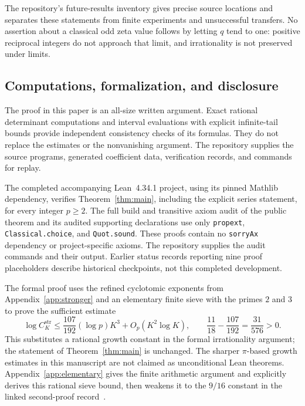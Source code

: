 \documentclass[11pt,letterpaper]{article}
\numberwithin{equation}{section}
\theoremstyle{remark}
\begin{document}
The repository's future-results inventory gives precise source locations and separates these statements from finite experiments and unsuccessful transfers. No assertion about a classical odd zeta value follows by letting $q$ tend to one: positive reciprocal integers do not approach that limit, and irrationality is not preserved under limits.

\subsection{Computations, formalization, and disclosure}

The proof in this paper is an all-size written argument. Exact rational determinant computations and interval evaluations with explicit infinite-tail bounds provide independent consistency checks of its formulas. They do not replace the estimates or the nonvanishing argument. The repository supplies the source programs, generated coefficient data, verification records, and commands for replay.

The completed accompanying Lean~4.34.1 project, using its pinned Mathlib dependency, verifies Theorem~\ref{thm:main}, including the explicit series statement, for every integer $p\ge2$. The full build and transitive axiom audit of the public theorem and its audited supporting declarations use only \texttt{propext}, \texttt{Classical.choice}, and \texttt{Quot.sound}. These proofs contain no \texttt{sorryAx} dependency or project-specific axioms. The repository supplies the audit commands and their output. Earlier status records reporting nine proof placeholders describe historical checkpoints, not this completed development.

The formal proof uses the refined cyclotomic exponents from Appendix~\ref{app:stronger} and an elementary finite sieve with the primes $2$ and $3$ to prove the sufficient estimate
\begin{equation*}
 \log C_K^{\mathrm{str}}
 \le\frac{107}{192}(\log p)K^3+O_p(K^2\log K),
 \qquad
 \frac{11}{18}-\frac{107}{192}=\frac{31}{576}>0.
\end{equation*}
This substitutes a rational growth constant in the formal irrationality argument; the statement of Theorem~\ref{thm:main} is unchanged. The sharper $\pi$-based growth estimates in this manuscript are not claimed as unconditional Lean theorems. Appendix~\ref{app:elementary} gives the finite arithmetic argument and explicitly derives this rational sieve bound, then weakens it to the $9/16$ constant in the linked second-proof record~\cite{ElementaryRecord}.
\end{document}
